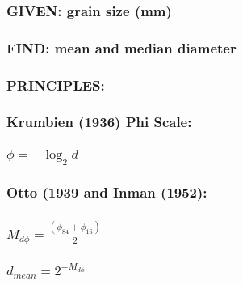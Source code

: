 \documentclass[11pt]{article}
\begin{document}
    \hypertarget{given-grain-size-mm}{%
\subsubsection{\texorpdfstring{{\textbf{GIVEN:}} grain size
(mm)}{GIVEN: grain size (mm)}}\label{given-grain-size-mm}}

\hypertarget{find-mean-and-median-diameter}{%
\subsubsection{\texorpdfstring{{\textbf{FIND:}} mean and median
diameter}{FIND: mean and median diameter}}\label{find-mean-and-median-diameter}}

\hypertarget{principles}{%
\subsubsection{\texorpdfstring{{\textbf{PRINCIPLES:}}}{PRINCIPLES:}}\label{principles}}

\hypertarget{krumbien-1936-phi-scale}{%
\subsubsection{Krumbien (1936) Phi
Scale:}\label{krumbien-1936-phi-scale}}

\hypertarget{phi--log_2-d}{%
\subsubsection{\texorpdfstring{\(\phi = -\log_2 d\)}{\textbackslash{}phi = -\textbackslash{}log\_2 d}}\label{phi--log_2-d}}

\hypertarget{otto-1939-and-inman-1952}{%
\subsubsection{Otto (1939 and Inman
(1952):}\label{otto-1939-and-inman-1952}}

\hypertarget{m_dphi-fracphi_84-phi_162}{%
\subsubsection{\texorpdfstring{\(M_{d\phi} = \frac{(\phi_{84} + \phi_{16})}2\)}{M\_\{d\textbackslash{}phi\} = \textbackslash{}frac\{(\textbackslash{}phi\_\{84\} + \textbackslash{}phi\_\{16\})\}2}}\label{m_dphi-fracphi_84-phi_162}}

\hypertarget{d_mean-2-m_dphi}{%
\subsubsection{\texorpdfstring{\(d_{mean} = {2}^{-M_{d\phi}}\)}{d\_\{mean\} = \{2\}\^{}\{-M\_\{d\textbackslash{}phi\}\}}}\label{d_mean-2-m_dphi}}
\end{document}
